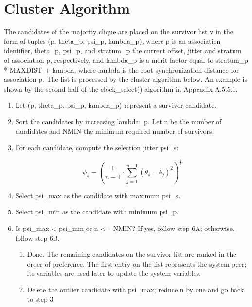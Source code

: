 \section{Cluster Algorithm}

The candidates of the majority clique are placed on the survivor list
v in the form of tuples (p, theta\_p, psi\_p, lambda\_p), where p is an
association identifier, theta\_p, psi\_p, and stratum\_p the current
offset, jitter and stratum of association p, respectively, and
lambda\_p is a merit factor equal to stratum\_p * MAXDIST + lambda,
where lambda is the root synchronization distance for association p.
The list is processed by the cluster algorithm below.  An example is
shown by the second half of the clock\_select() algorithm in
Appendix A.5.5.1.

\begin{enumerate}
  \item Let (p, theta\_p, psi\_p, lambda\_p) represent a survivor candidate.

  \item Sort the candidates by increasing lambda\_p.  Let n be the number
    of candidates and NMIN the minimum required number of survivors.

  \item For each candidate, compute the selection jitter psi\_s:

    $$
    \psi_s = \left( \frac{1}{n - 1} \cdot \sum^{n - 1}_{j = 1} (\theta_s - \theta_j)^2 \right)^{\frac{1}{2}}
    $$

  \item Select psi\_max as the candidate with maximum psi\_s.
  \item Select psi\_min as the candidate with minimum psi\_p.

  \item Is psi\_max < psi\_min or n <= NMIN?  If yes, follow step 6A;
    otherwise, follow step 6B.

    \begin{enumerate}[6A.]
      \item Done. The remaining candidates on the survivor list are ranked
      in the order of preference.  The first entry on the list represents
      the system peer; its variables are used later to update the system
      variables.

      \item Delete the outlier candidate with psi\_max; reduce n by one and go
      back to step 3.
    \end{enumerate}
\end{enumerate}

